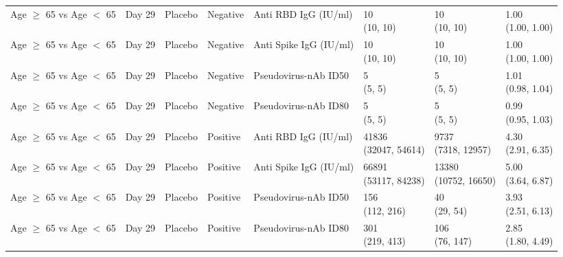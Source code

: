 \documentclass[]{book}
\theoremstyle{definition}
\theoremstyle{definition}
\theoremstyle{definition}
\newcommand{\1}{\mathbbm{1}}
\begin{document}
\begin{landscape}
\begin{ThreePartTable}
\begin{longtable}[t]{>{\raggedright\arraybackslash}p{2.7cm}lllllll}
Age $\geq$ 65 vs Age $<$ 65 & Day 29 & Placebo & Negative & Anti RBD IgG (IU/ml) & \makecell[l]{10\\(10, 10)} & \makecell[l]{10\\(10, 10)} & \makecell[l]{1.00\\(1.00, 1.00)}\\
\addlinespace
Age $\geq$ 65 vs Age $<$ 65 & Day 29 & Placebo & Negative & Anti Spike IgG (IU/ml) & \makecell[l]{10\\(10, 10)} & \makecell[l]{10\\(10, 10)} & \makecell[l]{1.00\\(1.00, 1.00)}\\
Age $\geq$ 65 vs Age $<$ 65 & Day 29 & Placebo & Negative & Pseudovirus-nAb ID50 & \makecell[l]{5\\(5, 5)} & \makecell[l]{5\\(5, 5)} & \makecell[l]{1.01\\(0.98, 1.04)}\\
Age $\geq$ 65 vs Age $<$ 65 & Day 29 & Placebo & Negative & Pseudovirus-nAb ID80 & \makecell[l]{5\\(5, 5)} & \makecell[l]{5\\(5, 5)} & \makecell[l]{0.99\\(0.95, 1.03)}\\
Age $\geq$ 65 vs Age $<$ 65 & Day 29 & Placebo & Positive & Anti RBD IgG (IU/ml) & \makecell[l]{41836\\(32047, 54614)} & \makecell[l]{9737\\(7318, 12957)} & \makecell[l]{4.30\\(2.91, 6.35)}\\
Age $\geq$ 65 vs Age $<$ 65 & Day 29 & Placebo & Positive & Anti Spike IgG (IU/ml) & \makecell[l]{66891\\(53117, 84238)} & \makecell[l]{13380\\(10752, 16650)} & \makecell[l]{5.00\\(3.64, 6.87)}\\
\addlinespace
Age $\geq$ 65 vs Age $<$ 65 & Day 29 & Placebo & Positive & Pseudovirus-nAb ID50 & \makecell[l]{156\\(112, 216)} & \makecell[l]{40\\(29, 54)} & \makecell[l]{3.93\\(2.51, 6.13)}\\
Age $\geq$ 65 vs Age $<$ 65 & Day 29 & Placebo & Positive & Pseudovirus-nAb ID80 & \makecell[l]{301\\(219, 413)} & \makecell[l]{106\\(76, 147)} & \makecell[l]{2.85\\(1.80, 4.49)}\\

\end{longtable}
\end{ThreePartTable}
\end{landscape}
\end{document}
